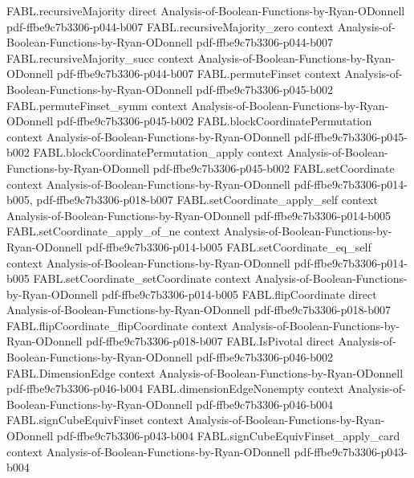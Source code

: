 \begin{theorem}
\proofstep
  {FABL.recursiveMajority}
  {direct}
  {Analysis-of-Boolean-Functions-by-Ryan-ODonnell}
  {pdf-ffbe9c7b3306-p044-b007}
\proofstep
  {FABL.recursiveMajority_zero}
  {context}
  {Analysis-of-Boolean-Functions-by-Ryan-ODonnell}
  {pdf-ffbe9c7b3306-p044-b007}
\proofstep
  {FABL.recursiveMajority_succ}
  {context}
  {Analysis-of-Boolean-Functions-by-Ryan-ODonnell}
  {pdf-ffbe9c7b3306-p044-b007}
\proofstep
  {FABL.permuteFinset}
  {context}
  {Analysis-of-Boolean-Functions-by-Ryan-ODonnell}
  {pdf-ffbe9c7b3306-p045-b002}
\proofstep
  {FABL.permuteFinset_symm}
  {context}
  {Analysis-of-Boolean-Functions-by-Ryan-ODonnell}
  {pdf-ffbe9c7b3306-p045-b002}
\proofstep
  {FABL.blockCoordinatePermutation}
  {context}
  {Analysis-of-Boolean-Functions-by-Ryan-ODonnell}
  {pdf-ffbe9c7b3306-p045-b002}
\proofstep
  {FABL.blockCoordinatePermutation_apply}
  {context}
  {Analysis-of-Boolean-Functions-by-Ryan-ODonnell}
  {pdf-ffbe9c7b3306-p045-b002}
\proofstep
  {FABL.setCoordinate}
  {context}
  {Analysis-of-Boolean-Functions-by-Ryan-ODonnell}
  {pdf-ffbe9c7b3306-p014-b005,
    pdf-ffbe9c7b3306-p018-b007}
\proofstep
  {FABL.setCoordinate_apply_self}
  {context}
  {Analysis-of-Boolean-Functions-by-Ryan-ODonnell}
  {pdf-ffbe9c7b3306-p014-b005}
\proofstep
  {FABL.setCoordinate_apply_of_ne}
  {context}
  {Analysis-of-Boolean-Functions-by-Ryan-ODonnell}
  {pdf-ffbe9c7b3306-p014-b005}
\proofstep
  {FABL.setCoordinate_eq_self}
  {context}
  {Analysis-of-Boolean-Functions-by-Ryan-ODonnell}
  {pdf-ffbe9c7b3306-p014-b005}
\proofstep
  {FABL.setCoordinate_setCoordinate}
  {context}
  {Analysis-of-Boolean-Functions-by-Ryan-ODonnell}
  {pdf-ffbe9c7b3306-p014-b005}
\proofstep
  {FABL.flipCoordinate}
  {direct}
  {Analysis-of-Boolean-Functions-by-Ryan-ODonnell}
  {pdf-ffbe9c7b3306-p018-b007}
\proofstep
  {FABL.flipCoordinate_flipCoordinate}
  {context}
  {Analysis-of-Boolean-Functions-by-Ryan-ODonnell}
  {pdf-ffbe9c7b3306-p018-b007}
\proofstep
  {FABL.IsPivotal}
  {direct}
  {Analysis-of-Boolean-Functions-by-Ryan-ODonnell}
  {pdf-ffbe9c7b3306-p046-b002}
\proofstep
  {FABL.DimensionEdge}
  {context}
  {Analysis-of-Boolean-Functions-by-Ryan-ODonnell}
  {pdf-ffbe9c7b3306-p046-b004}
\proofstep
  {FABL.dimensionEdgeNonempty}
  {context}
  {Analysis-of-Boolean-Functions-by-Ryan-ODonnell}
  {pdf-ffbe9c7b3306-p046-b004}
\proofstep
  {FABL.signCubeEquivFinset}
  {context}
  {Analysis-of-Boolean-Functions-by-Ryan-ODonnell}
  {pdf-ffbe9c7b3306-p043-b004}
\proofstep
  {FABL.signCubeEquivFinset_apply_card}
  {context}
  {Analysis-of-Boolean-Functions-by-Ryan-ODonnell}
  {pdf-ffbe9c7b3306-p043-b004}

\end{theorem}

